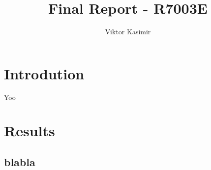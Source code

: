\documentclass[10pt,a4paper]{report}
\author{Viktor Kasimir}
\title{Final Report - R7003E}
\begin{document}
\maketitle

\section{Introdution}
Yoo

\section{Results}

\subsection{blabla}
\end{document}
